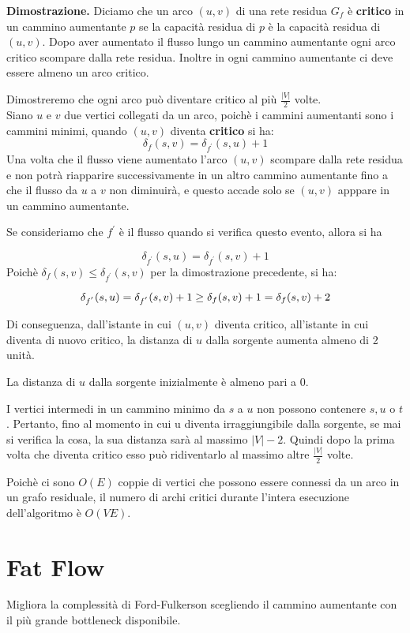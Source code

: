 \textbf{Dimostrazione.} Diciamo che un arco $(u,v)$ di una rete residua $G_f$ è \textbf{critico} in un cammino aumentante $p$ se la capacità residua di $p$ è la capacità residua di $(u,v)$.
Dopo aver aumentato il flusso lungo un cammino aumentante ogni arco critico scompare dalla rete residua. Inoltre in ogni cammino aumentante ci deve essere almeno un arco critico.

Dimostreremo che ogni arco può diventare critico al più $\frac{|V|}{2}$ volte.\\

Siano $u$ e $v$ due vertici collegati da un arco, poichè i cammini aumentanti sono i cammini minimi, quando $(u,v)$ diventa \textbf{critico} si ha:
$$
    \delta_f(s,v) = \delta_{f^{'}}(s,u) +1
$$
Una volta che il flusso viene aumentato l'arco $(u,v)$ scompare dalla rete residua e non potrà riapparire successivamente in un altro cammino aumentante fino a che il flusso da $u$ a $v$ non diminuirà, e questo accade solo se $(u,v)$ apppare in un cammino aumentante.

Se consideriamo che $f^{'}$ è il flusso quando si verifica questo evento, allora si ha

$$
    \delta_{f^{'}}(s,u) = \delta_{f^{'}}(s,v) +1
$$
Poichè $\delta_f(s,v) \le \delta_{f^{'}}(s,v)$ per la dimostrazione precedente, si ha:

$$
    \delta_{f^{'}}(s,u) =  \delta_{f^{'}}(s,v) + 1 \\
    \ge \delta_f(s,v) + 1
    = \delta_f(s,v) +2
$$


Di conseguenza, dall'istante in cui $(u,v)$ diventa critico, all'istante in cui diventa di nuovo critico, la distanza di $u$ dalla sorgente aumenta almeno di 2 unità.

La distanza di $u$ dalla sorgente inizialmente è almeno pari a 0.

I vertici intermedi in un cammino minimo da $s$ a $u$ non possono contenere $s, u$ o $t$.
Pertanto, fino al momento in cui u diventa irraggiungibile dalla sorgente, se mai si verifica la cosa, la sua distanza sarà al massimo $|V| -2$. Quindi dopo la prima volta che diventa critico esso può ridiventarlo al massimo altre $\frac{|V|}{2}$ volte.

Poichè ci sono $O(E)$ coppie di vertici che possono essere connessi da un arco in un grafo residuale, il numero di archi critici durante l'intera esecuzione dell'algoritmo è  $O(VE)$.




\section{Fat Flow}
Migliora la complessità di Ford-Fulkerson scegliendo il cammino aumentante con il più grande bottleneck disponibile.\\

